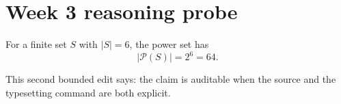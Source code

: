 \documentclass[11pt]{article}
\begin{document}
\section*{Week 3 reasoning probe}

For a finite set $S$ with $|S| = 6$, the power set has
\[
  |\mathcal{P}(S)| = 2^6 = 64.
\]

This second bounded edit says: the claim is auditable when the source and
the typesetting command are both explicit.
\end{document}

